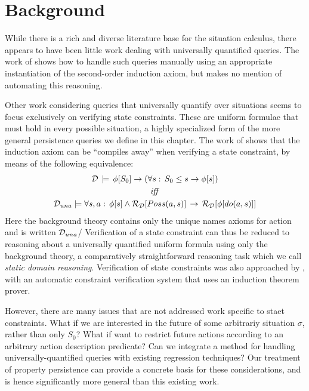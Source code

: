\section{Background\label{sec:Persistence:Background}}

While there is a rich and diverse literature base for the situation
calculus, there appears to have been little work dealing with universally
quantified queries. The work of \citet{Reiter93proving} shows how
to handle such queries manually using an appropriate instantiation
of the second-order induction axiom, but makes no mention of automating
this reasoning.

Other work considering queries that universally quantify over situations
seems to focus exclusively on verifying state constraints. These are
uniform formulae that must hold in every possible situation, a highly
specialized form of the more general persistence queries we define
in this chapter. The work of \citet{Lin94-StateConstraints} shows
that the induction axiom can be {}``compiles away'' when verifying
a state constraint, by means of the following equivalence:\begin{gather*}
\mathcal{D}\,\models\,\phi[S_{0}]\rightarrow\left(\forall s:\, S_{0}\leq s\rightarrow\phi[s]\right)\\
\mathit{iff}\\
\mathcal{D}_{una}\models\forall s,a:\,\phi[s]\wedge\mathcal{R}_{\mathcal{D}}[Poss(a,s)]\,\rightarrow\,\mathcal{R}_{\mathcal{D}}[\phi[do(a,s)]]\end{gather*}
 Here the background theory contains only the unique names axioms
for action and is written $\mathcal{D}_{una}$/ Verification of a state constraint
can thus be reduced to reasoning about a universally quantified uniform
formula using only the background theory, a comparatively straightforward
reasoning task which we call \emph{static domain reasoning}. Verification
of state constraints was also approached by \citet{bertossi96automating},
with an automatic constraint verification system that uses an induction theorem prover.


However, there are many issues that are not addressed work specific
to staet constraints. What if we are interested in the future of some
arbitrariy situation $\sigma$, rather than only $S_{0}$? What if
want to restrict future actions according to an arbitrary action description
predicate? Can we integrate a method for handling universally-quantified
queries with existing regression techniques? Our treatment of property
persistence can provide a concrete basis for these considerations,
and is hence significantly more general than this existing work.

